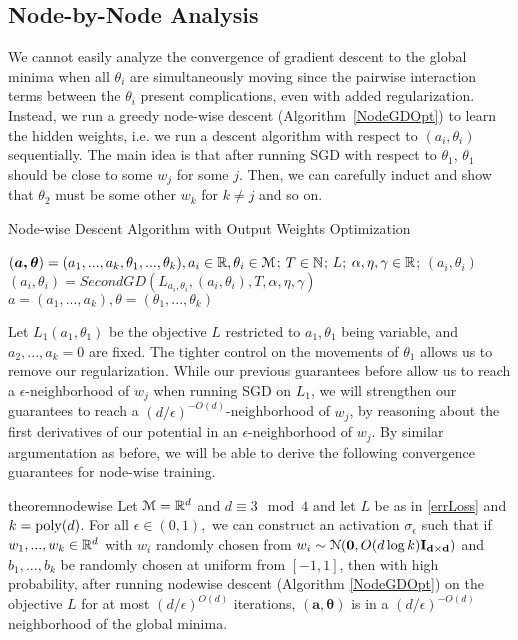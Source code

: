 \subsection{Node-by-Node Analysis}
We cannot easily analyze the convergence of gradient descent to the global minima when all $\theta_i$ are simultaneously moving since the pairwise interaction terms between the $\theta_i$ present complications, even with added regularization. Instead, we run a greedy
node-wise descent (Algorithm~\ref{NodeGDOpt}) to learn the hidden weights, i.e. we run a descent algorithm with respect to $(a_i,\theta_i)$ sequentially. The
main idea is that after running SGD with respect to $\theta_1$,
$\theta_1$ should be close to some $w_j$ for some $j$. Then, we can
carefully induct and show that $\theta_2$ must be some other $w_k$ for
$k\neq j$ and so on.

%
\begin{algorithm}[tb]
 \caption{Node-wise Descent Algorithm with Output Weights Optimization}
   \label{NodeGDOpt}
\begin{algorithmic}
  $(\boldsymbol{a,\theta}) = (a_1,...,a_k,\theta_1,...,\theta_k), a_i
  \in{\mathbb{R}}, \theta_i\in\mathcal{M}$;
  $T\in {\mathbb{N}}$; $L$; $\alpha, \eta, \gamma \in {\mathbb{R}}$; 
   $(a_i, \theta_i)$
  \State $(a_i, \theta_i) = SecondGD \left(L_{a_i, \theta_i},(a_i,\theta_i),T, \alpha,\eta,\gamma \right)$
   \EndFor
    $a = (a_1,...,a_k), \theta = (\theta_1,..., \theta_k)$
   \end{algorithmic}
\end{algorithm}

Let $L_1(a_1,\theta_1)$ be the objective $L$ restricted to $a_1,\theta_1$ being variable, and $a_2,...,a_k = 0$ are fixed. The tighter control on the movements of $\theta_1$ allows us to remove our regularization. While our previous guarantees before allow us to reach a $\epsilon$-neighborhood of $w_j$ when running SGD on $L_1$, we will strengthen our guarantees to reach a $(d/\epsilon)^{-O(d)}$-neighborhood of $w_j$, by reasoning about the first derivatives of our potential in an $\epsilon$-neighborhood of $w_j$. By similar argumentation as before, we will be able to derive the following convergence guarantees for node-wise training. 

\begin{restatable}{theorem}{nodewise}\label{nodeWise}
Let $\mathcal{M} = {\mathbb{R}}^{d}$ and $d \equiv 3 \mod 4$ and let $L$ be as in \ref{errLoss} and $k = \mathrm{poly}(d)$. For all $\epsilon \in (0,1),$ we can construct an activation $\sigma_\epsilon$ such that if $w_1,...,w_k \in {\mathbb{R}}^d$ with $w_i$ randomly chosen from $w_i \sim  \mathcal{N}({\bf 0}, O(d\log k){\bf I_{d\times d}})$ and $b_1,...,b_k$ be randomly chosen at uniform from $[-1,1]$, then with high probability, after running nodewise descent (Algorithm \ref{NodeGDOpt}) on the objective $L$ for at most $(d/\epsilon)^{O(d)}$ iterations, $\boldsymbol{(a,\theta)}$ is in a $(d/\epsilon)^{-O(d)}$ neighborhood of the global minima.
\end{restatable}

